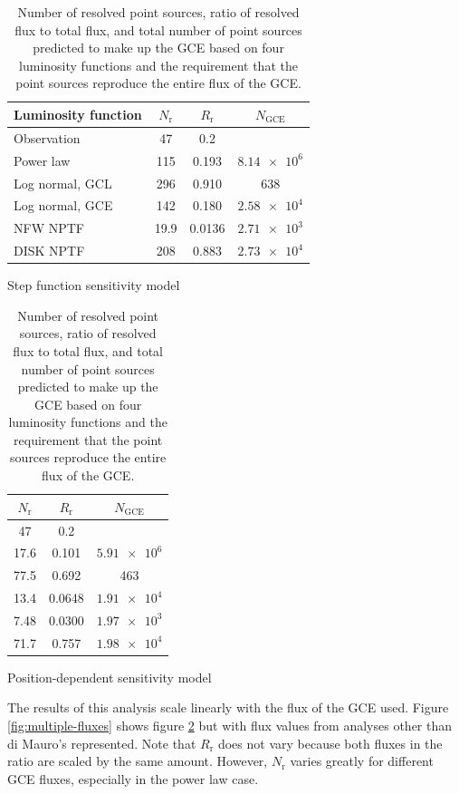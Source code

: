 \documentclass[a4paper,11pt]{article}
\begin{document}
\begin{table}
    \centering
    \begin{subtable}[h]{0.55\textwidth}
        \begin{tabular}{|l|c|c|c|}
            \hline
            Luminosity function & $N_\text{r}$ & $R_\text{r}$ & $N_\text{GCE}$\\ \hline \hline
            Observation & 47 & 0.2 & \\ \hline
            Power law & 115 & 0.193 & $\num{8.14e6}$ \\
            Log normal, GCL & 296 & 0.910 & 638 \\
            Log normal, GCE & 142 & 0.180 & $\num{2.58e4}$ \\
            NFW NPTF & 19.9 & 0.0136 & $\num{2.71e3}$ \\
            DISK NPTF & 208 & 0.883 & $\num{2.73e4}$ \\
            \hline
        \end{tabular}
        \caption{Step function sensitivity model}
        \label{tab:step-function-results}
    \end{subtable}
    \hfill
    \begin{subtable}[h]{0.44\textwidth}
        \begin{tabular}{|c|c|c|}
            \hline
            $N_\text{r}$ & $R_\text{r}$ & $N_\text{GCE}$\\ \hline \hline
            47 & 0.2 & \\ \hline
            17.6 & 0.101 & $\num{5.91e6}$ \\
            77.5 & 0.692 & 463 \\
            13.4 & 0.0648 & $\num{1.91e4}$ \\
            7.48 & 0.0300 & $\num{1.97e3}$ \\
            71.7 & 0.757 & $\num{1.98e4}$ \\
            \hline
        \end{tabular}
        \caption{Position-dependent sensitivity model}
        \label{tab:position-dependent-results}
    \end{subtable}
    \caption{Number of resolved point sources, ratio of resolved flux to total flux, and total number of point sources predicted to make up the GCE based on four luminosity functions and the requirement that the point sources reproduce the entire flux of the GCE.}
\end{table}

The results of this analysis scale linearly with the flux of the GCE used. Figure \ref{fig:multiple-fluxes} shows figure \ref{tab:position-dependent-results} but with flux values from analyses other than di Mauro's represented. Note that $R_\text{r}$ does not vary because both fluxes in the ratio are scaled by the same amount. However, $N_\text{r}$ varies greatly for different GCE fluxes, especially in the power law case.
\end{document}
